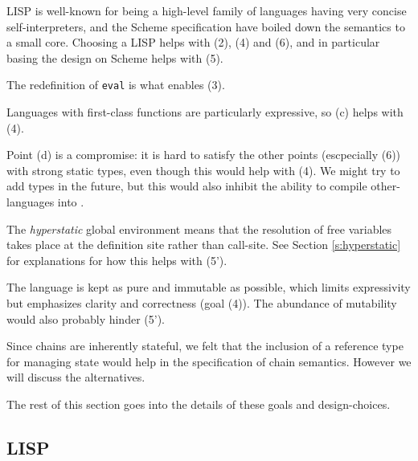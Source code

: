 LISP is well-known for being a high-level family of languages having very concise
self-interpreters, and the Scheme specification have boiled down the
semantics to a small core. Choosing a LISP helps with (2), (4) and (6), and in
particular basing the design on Scheme helps with (5).

The redefinition of \texttt{eval} is what enables (3).

Languages with first-class functions are particularly expressive, so (c) helps
with (4).

Point (d) is a compromise: it is hard to satisfy the other points (escpecially
(6)) with strong static types, even though this would help with (4). We might
try to add types in the future, but this would also inhibit the ability to
compile other-languages into \rad.

The \emph{hyperstatic} global environment means that the resolution of free
variables takes place at the definition site rather than call-site. See Section
\ref{s:hyperstatic} for explanations for how this helps with (5').

The language is kept as pure and immutable as possible, which limits
expressivity but emphasizes clarity and correctness (goal (4)). The abundance of
mutability would also probably hinder (5').

Since chains are inherently stateful, we felt that the inclusion of a reference
type for managing state would help in the specification of chain semantics.
However we will discuss the alternatives.

The rest of this section goes into the details of these goals and
design-choices.




\subsection{LISP}

